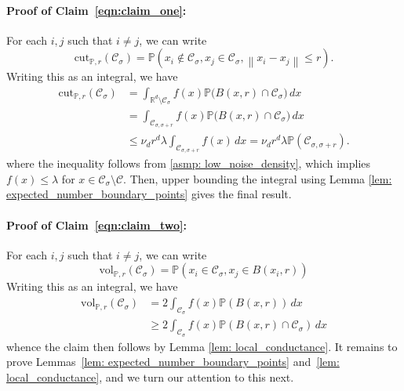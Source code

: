 \documentclass[11pt,twoside]{article}
\newcommand{\vol}{\mathrm{vol}}
\newcommand{\cut}{\mathrm{cut}}
\newcommand{\Reals}{\mathbb{R}}
\newcommand{\Rd}{\Reals^d}
\newcommand{\norm}[1]{\left\lVert#1\right\rVert}
\newcommand{\1}{\mathbf{1}}
\newcommand{\Pbb}{\mathbb{P}}
\newcommand{\Cset}{\mathcal{C}}
\newcommand{\Csig}{\Cset_{\sigma}}
\newcommand{\Csigr}{\Cset_{\sigma,\sigma + r}}
\newcommand{\dx}{\,dx}
\begin{document}
\paragraph{Proof of Claim~\eqref{eqn:claim_one}: } For each $i,j$ such that $i \neq j$, we can write 
\begin{equation*}
\cut_{\Pbb,r}(\Csig) =  \Pbb(x_i \not\in \Csig, x_j \in \Csig, \norm{x_i - x_j} \leq r).
\end{equation*}
Writing this as an integral, we have
\begin{align*}
\cut_{\Pbb,r}(\Csig) & = \int_{\Rd \setminus \Csig} f(x) \Pbb\bigl(B(x,r) \cap \Csig\bigr) \dx \\
& = \int_{\Csigr} f(x) \Pbb\bigl(B(x,r) \cap \Csig\bigr) \dx \\
& \leq \nu_d r^d \lambda  \int_{\Csigr} f(x) \dx = \nu_d r^d \lambda \Pbb(\Csigr).
\end{align*}
where the inequality follows from \ref{asmp: low_noise_density}, which implies $f(x) \leq \lambda$ for $x \in \Csig \setminus \Cset$. Then, upper bounding the integral using Lemma \ref{lem: expected_number_boundary_points} gives the final result.


\paragraph{Proof of Claim~\eqref{eqn:claim_two}: }  For each $i,j$ such that $i \neq j$, we can write 
\begin{equation*}
\vol_{\Pbb,r}(\Csig) = \Pbb(x_i \in \Csig, x_j \in B(x_i,r))
\end{equation*}
Writing this as an integral, we have
\begin{align*}
\vol_{\Pbb,r}(\Csig) & = 2 \int_{\Csig} f(x) \Pbb(B(x,r)) \dx \\
& \geq 2 \int_{\Csig} f(x) \Pbb(B(x,r) \cap \Csig) \dx
\end{align*}
whence the claim then follows by Lemma \ref{lem: local_conductance}.
It remains to prove Lemmas~\ref{lem: expected_number_boundary_points} and~\ref{lem: local_conductance}, and we turn our attention to this next.
\end{document}

